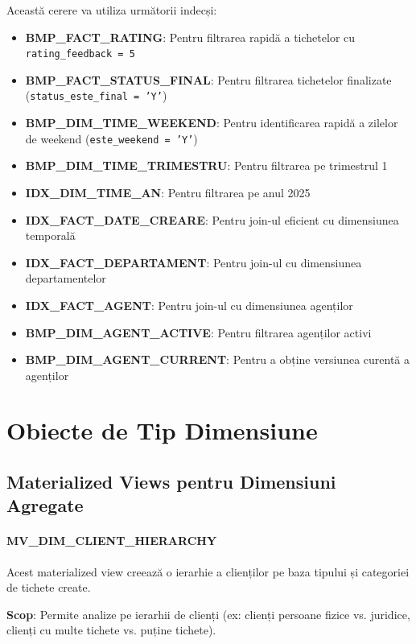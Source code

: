 Această cerere va utiliza următorii indecși:
\begin{itemize}
    \item \textbf{BMP\_FACT\_RATING}: Pentru filtrarea rapidă a tichetelor cu \texttt{rating\_feedback = 5}
    \item \textbf{BMP\_FACT\_STATUS\_FINAL}: Pentru filtrarea tichetelor finalizate (\texttt{status\_este\_final = 'Y'})
    \item \textbf{BMP\_DIM\_TIME\_WEEKEND}: Pentru identificarea rapidă a zilelor de weekend (\texttt{este\_weekend = 'Y'})
    \item \textbf{BMP\_DIM\_TIME\_TRIMESTRU}: Pentru filtrarea pe trimestrul 1
    \item \textbf{IDX\_DIM\_TIME\_AN}: Pentru filtrarea pe anul 2025
    \item \textbf{IDX\_FACT\_DATE\_CREARE}: Pentru join-ul eficient cu dimensiunea temporală
    \item \textbf{IDX\_FACT\_DEPARTAMENT}: Pentru join-ul cu dimensiunea departamentelor
    \item \textbf{IDX\_FACT\_AGENT}: Pentru join-ul cu dimensiunea agenților
    \item \textbf{BMP\_DIM\_AGENT\_ACTIVE}: Pentru filtrarea agenților activi
    \item \textbf{BMP\_DIM\_AGENT\_CURRENT}: Pentru a obține versiunea curentă a agenților
\end{itemize}


\chapter{Obiecte de Tip Dimensiune}
\label{sec:obiecte_dimensiune}

\section{Materialized Views pentru Dimensiuni Agregate}

\subsubsection{MV\_DIM\_CLIENT\_HIERARCHY}

Acest materialized view creează o ierarhie a clienților pe baza tipului și categoriei de tichete create.

\textbf{Scop}: Permite analize pe ierarhii de clienți (ex: clienți persoane fizice vs. juridice, clienți cu multe tichete vs. puține tichete).

